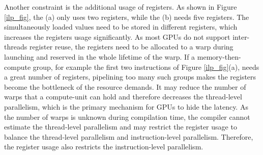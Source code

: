 \documentclass{article}
\begin{document}
Another constraint is the additional usage of registers. As shown in Figure \ref{ilp_fig}, the (a) only uses two registers, while the (b) needs five registers. The simultaneously loaded values need to be stored in different registers, which increases the registers usage significantly. As most GPUs do not support inter-threads register reuse, the registers need to be allocated to a warp during launching and reserved in the whole lifetime of the warp. If a memory-then-compute group, for example the first two instructions of Figure \ref{ilp_fig}(a), needs a great number of registers, pipelining too many such groups makes the registers become the bottleneck of the resource demands. It may reduce the number of warps that a compute-unit can hold and therefore decreases the thread-level parallelism, which is the primary mechanism for GPUs to hide the latency. As the number of warps is unknown during compilation time, the compiler cannot estimate the thread-level parallelism and may restrict the register usage to balance the thread-level parallelism and instruction-level parallelism. Therefore, the register usage also restricts the instruction-level parallelism. 


\end{document}

